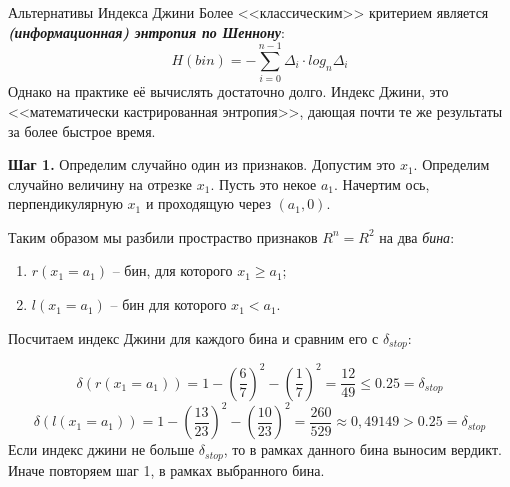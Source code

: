 \documentclass{beamer}
\newcommand{\termdef}[1]{\textbf{\textit{#1}}}
\newcommand{\term}{\textit}
\begin{document}
\begin{frame}{Альтернативы Индекса Джини}
	Более <<классическим>> критерием является 
	\termdef{(информационная) энтропия по Шеннону}:
	\begin{equation}
	H(bin) = - \sum_{i=0}^{n-1} \Delta_i \cdot log_n \Delta_i 
	\end{equation}
	Однако на практике её вычислять достаточно долго. 
	Индекс Джини, это <<математически кастрированная энтропия>>,
	дающая почти те же результаты за более быстрое время.
	


\end{frame}




\begin{frame}
	\small
	\textbf{Шаг 1.} Определим случайно один из признаков. Допустим это $x_1$. 
	Определим случайно величину на отрезке $x_1$. Пусть это некое $a_1$. 
	Начертим ось, перпендикулярную $x_1$ и проходящую через $(a_1, 0)$.
	\begin{center}
		\begin{tikzpicture}[scale=1.5]
		
		\end{tikzpicture}
	\end{center}
	Таким образом мы разбили простраство признаков
	$R^n=R^2$ на два \term{бина}:
	\begin{enumerate}
		\item $r(x_1=a_1)$ -- бин, для которого $x_1 \geqslant a_1$;
		\item $l(x_1=a_1)$ -- бин для которого $x_1 < a_1$.
	\end{enumerate}
\end{frame}

\begin{frame}
	\small
	Посчитаем индекс Джини для каждого бина и сравним его с $\delta_{stop}$:
	\begin{center}
		\begin{tikzpicture}[scale=1.5]
		
		\end{tikzpicture}
	\end{center}
	\begin{equation*}
	\delta \left(r(x_1=a_1)\right) = 
	1 - \left(\frac{6}{7}\right)^2 - \left( \frac{1}{7}\right)^2 =
	\frac{12}{49} \leqslant 0.25 = \delta_{stop}
	\end{equation*}
	\begin{equation*}
	\delta \left(l(x_1=a_1)\right) = 
	1 - \left( \frac{13}{23} \right)^2 - \left( \frac{10}{23} \right)^2 
	= \frac{260}{529} \approx 0,49149 > 0.25 = \delta_{stop}
	\end{equation*}
	Если индекс джини не больше $\delta_{stop}$, то в рамках данного бина выносим 
	вердикт. Иначе повторяем шаг 1, в рамках выбранного бина.
\end{frame}
\end{document}
